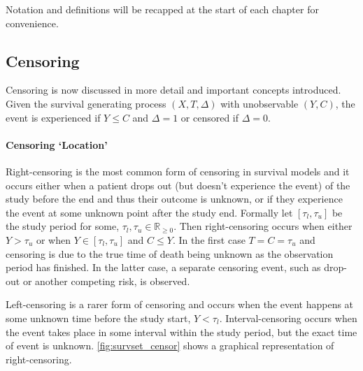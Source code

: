 \documentclass[
  letterpaper,
]{scrbook}
\let\oldparagraph\paragraph
\renewcommand{\paragraph}[1]{\oldparagraph{#1}\mbox{}}
\theoremstyle{plain}
\theoremstyle{definition}
\theoremstyle{remark}
\begin{document}
Notation and definitions will be recapped at the start of each chapter
for convenience.

\subsection{Censoring}
\label{sec:surv_set_cens}

Censoring is now discussed in more detail and important concepts
introduced. Given the survival generating process \((X,T,\Delta)\) with
unobservable \((Y,C)\), the event is experienced if \(Y \leq C\) and
\(\Delta = 1\) or censored if \(\Delta = 0\).

\noindent 

\paragraph{Censoring `Location'}

Right-censoring is the most common form of censoring in survival models
and it occurs either when a patient drops out (but doesn't experience
the event) of the study before the end and thus their outcome is
unknown, or if they experience the event at some unknown point after the
study end. Formally let \([\tau_l, \tau_u]\) be the study period for
some, \(\tau_l,\tau_u \in \mathbb{R}_{\geq 0}\). Then right-censoring
occurs when either \(Y > \tau_u\) or when \(Y \in [\tau_l,\tau_u]\) and
\(C \leq Y\). In the first case \(T = C = \tau_u\) and censoring is due
to the true time of death being unknown as the observation period has
finished. In the latter case, a separate censoring event, such as
drop-out or another competing risk, is observed.

Left-censoring is a rarer form of censoring and occurs when the event
happens at some unknown time before the study start, \(Y < \tau_l\).
Interval-censoring occurs when the event takes place in some interval
within the study period, but the exact time of event is unknown.
\ref{fig:survset_censor} shows a graphical representation of
right-censoring.
\end{document}
